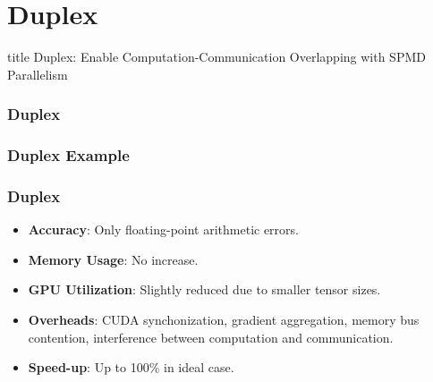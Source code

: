 \documentclass[12pt,aspectratio=169]{beamer}
\begin{document}
    \section*{Duplex}

    \begin{frame}
        \centering
        \begin{beamercolorbox}[sep=8pt,center,shadow=true,rounded=true]{title}
          Duplex: Enable Computation-Communication Overlapping with SPMD Parallelism\par%
        \end{beamercolorbox}
    \end{frame}

    \begin{frame}
        \frametitle{Duplex}

    \end{frame}

    \begin{frame}
        \frametitle{Duplex Example}

        \centering
    \end{frame}

    \begin{frame}
        \frametitle{Duplex}

        \begin{itemize}
            \setlength{\itemsep}{.8em}
            \item \textbf{Accuracy}: Only floating-point arithmetic errors.
            \item \textbf{Memory Usage}: No increase.
            \item \textbf{GPU Utilization}: Slightly reduced due to smaller tensor sizes.
            \item \textbf{Overheads}: CUDA synchonization, gradient aggregation, memory bus contention, interference between computation and communication.
            \item \textbf{Speed-up}: Up to 100\% in ideal case.
        \end{itemize}
    \end{frame}
\end{document}
